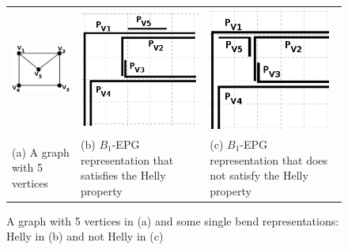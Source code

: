 \documentclass[12pt]{article}
\begin{document}
\begin{figure}[h]
  \centering
  \begin{tabular}{ p{3.2cm} p{4.5cm} p{4.5cm} }
    \centering \includegraphics[width=3cm]{envelope} & \includegraphics[width=4cm]{envelopeHellyGradeTransparente} & \includegraphics[width=4cm]{envelopeNaoHellyGrade}
    \\
    \footnotesize \centering (a) A  graph with 5 vertices & \footnotesize(b) $B_1$-EPG representation that satisfies the Helly property & \footnotesize (c) $B_1$-EPG representation that does  not satisfy the Helly property  \\

  \end{tabular}
\caption{A  graph with 5 vertices in (a) and some single bend representations: Helly in (b) and not Helly in (c)} \label{fig:envelopeRepresentacoes}
\end{figure}



  
\end{document}
